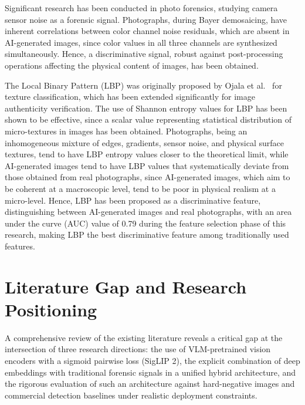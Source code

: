 Significant research has been conducted in photo forensics, studying camera sensor noise as a forensic signal. Photographs, during Bayer demosaicing, have inherent correlations between color channel noise residuals, which are absent in AI-generated images, since color values in all three channels are synthesized simultaneously. Hence, a discriminative signal, robust against post-processing operations affecting the physical content of images, has been obtained.

The Local Binary Pattern (LBP) was originally proposed by Ojala et al.~\cite{ojala2002lbp} for texture classification, which has been extended significantly for image authenticity verification. The use of Shannon entropy values for LBP has been shown to be effective, since a scalar value representing statistical distribution of micro-textures in images has been obtained. Photographs, being an inhomogeneous mixture of edges, gradients, sensor noise, and physical surface textures, tend to have LBP entropy values closer to the theoretical limit, while AI-generated images tend to have LBP values that systematically deviate from those obtained from real photographs, since AI-generated images, which aim to be coherent at a macroscopic level, tend to be poor in physical realism at a micro-level. Hence, LBP has been proposed as a discriminative feature, distinguishing between AI-generated images and real photographs, with an area under the curve (AUC) value of 0.79 during the feature selection phase of this research, making LBP the best discriminative feature among traditionally used features.

\section{Literature Gap and Research Positioning}

A comprehensive review of the existing literature reveals a critical gap at the intersection of three research directions: the use of VLM-pretrained vision encoders with a sigmoid pairwise loss (SigLIP 2), the explicit combination of deep embeddings with traditional forensic signals in a unified hybrid architecture, and the rigorous evaluation of such an architecture against hard-negative images and commercial detection baselines under realistic deployment constraints.

